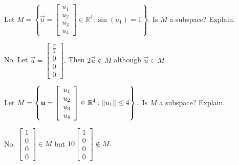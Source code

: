 \documentclass{ximera}
\begin{document}
\begin{problem}\label{prb:5.9} Let $M=\left\{ \vec{u}=\left[
\begin{array}{c}
u_{1} \\
u_{2} \\
u_{3} \\
u_{4}
\end{array}
\right] \in
\mathbb{R}^{4}:\sin \left( u_{1}\right) =1\right\} .$ Is $M$ a subspace?
Explain.
\begin{hint}
No. Let $\vec{u}=\left[ \begin{array}{r}
\frac{\pi }{2} \\
0 \\
0 \\
0
\end{array}
\right] .$ Then $2\vec{u}\notin M$ although $\vec{u}\in M$.
\end{hint}
\end{problem}

\begin{problem}\label{prb:5.10} Let $M=\left\{ \mathbf{u}=\left[ \begin{array}{c}
u_{1} \\
u_{2} \\
u_{3} \\
u_{4}
\end{array}\right] \in
\mathbb{R}^{4}:\left\lVert u_{1}\right\rVert \leq 4\right\} .$ Is $M$ a
subspace? Explain.
\begin{hint}
No. $\left[
\begin{array}{r}
1 \\
0 \\
0 \\
0
\end{array}
\right] \in M$ but $10\left[ \begin{array}{r}
1 \\
0 \\
0 \\
0
\end{array}
\right] \notin M.$
\end{hint}
\end{problem}
\end{document}
